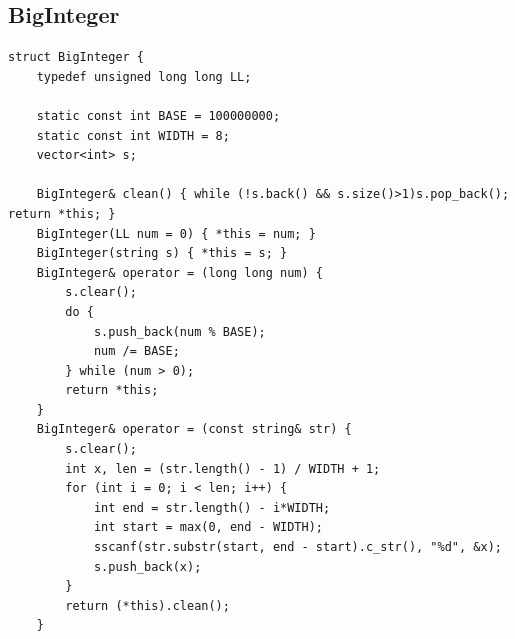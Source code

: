 \documentclass[twoside]{article}
\begin{document}
\subsection{BigInteger}
\begin{lstlisting}
struct BigInteger {
    typedef unsigned long long LL;

    static const int BASE = 100000000;
    static const int WIDTH = 8;
    vector<int> s;

    BigInteger& clean() { while (!s.back() && s.size()>1)s.pop_back(); return *this; }
    BigInteger(LL num = 0) { *this = num; }
    BigInteger(string s) { *this = s; }
    BigInteger& operator = (long long num) {
        s.clear();
        do {
            s.push_back(num % BASE);
            num /= BASE;
        } while (num > 0);
        return *this;
    }
    BigInteger& operator = (const string& str) {
        s.clear();
        int x, len = (str.length() - 1) / WIDTH + 1;
        for (int i = 0; i < len; i++) {
            int end = str.length() - i*WIDTH;
            int start = max(0, end - WIDTH);
            sscanf(str.substr(start, end - start).c_str(), "%d", &x);
            s.push_back(x);
        }
        return (*this).clean();
    }


\end{lstlisting}
\end{document}
